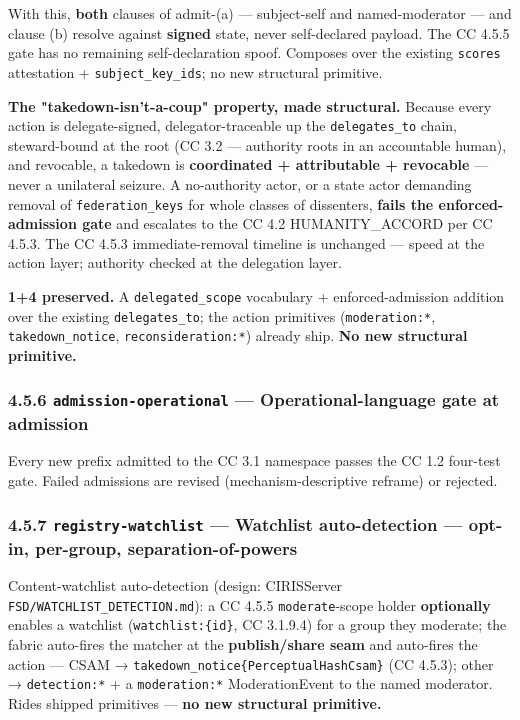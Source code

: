 \documentclass[11pt]{article}
\begin{document}
With this, \textbf{both} clauses of admit-(a) — subject-self and named-moderator — and clause (b) resolve against \textbf{signed} state, never self-declared payload. The CC 4.5.5 gate has no remaining self-declaration spoof. Composes over the existing \texttt{scores} attestation + \texttt{subject\_key\_ids}; no new structural primitive.


\textbf{The "takedown-isn't-a-coup" property, made structural.} Because every action is delegate-signed, delegator-traceable up the \texttt{delegates\_to} chain, steward-bound at the root (CC 3.2 — authority roots in an accountable human), and revocable, a takedown is \textbf{coordinated + attributable + revocable} — never a unilateral seizure. A no-authority actor, or a state actor demanding removal of \texttt{federation\_keys} for whole classes of dissenters, \textbf{fails the enforced-admission gate} and escalates to the CC 4.2 HUMANITY\_ACCORD per CC 4.5.3. The CC 4.5.3 immediate-removal timeline is unchanged — speed at the action layer; authority checked at the delegation layer.


\textbf{1+4 preserved.} A \texttt{delegated\_scope} vocabulary + enforced-admission addition over the existing \texttt{delegates\_to}; the action primitives (\texttt{moderation:*}, \texttt{takedown\_notice}, \texttt{reconsideration:*}) already ship. \textbf{No new structural primitive.}


\subsubsection*{4.5.6 \texttt{admission-operational} — Operational-language gate at admission}


Every new prefix admitted to the CC 3.1 namespace passes the CC 1.2 four-test gate. Failed admissions are revised (mechanism-descriptive reframe) or rejected.


\subsubsection*{4.5.7 \texttt{registry-watchlist} — Watchlist auto-detection — opt-in, per-group, separation-of-powers}


Content-watchlist auto-detection (design: CIRISServer \texttt{FSD/WATCHLIST\_DETECTION.md}): a CC 4.5.5 \texttt{moderate}-scope holder \textbf{optionally} enables a watchlist (\texttt{watchlist:\{id\}}, CC 3.1.9.4) for a group they moderate; the fabric auto-fires the matcher at the \textbf{publish/share seam} and auto-fires the action — CSAM → \texttt{takedown\_notice\{PerceptualHashCsam\}} (CC 4.5.3); other → \texttt{detection:*} + a \texttt{moderation:*} ModerationEvent to the named moderator. Rides shipped primitives — \textbf{no new structural primitive.}
\end{document}
